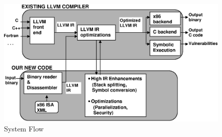 
\begin{figure}[t]
{
{
\centering
\includegraphics[width=0.7\linewidth]{figures/EPS/flow1.eps}
\caption{\scriptsize{System Flow}}
\label{fig:systemflow}
\vspace{-0.2in}
}
\hfill
\vspace{-0.2in}
}
\end{figure}
